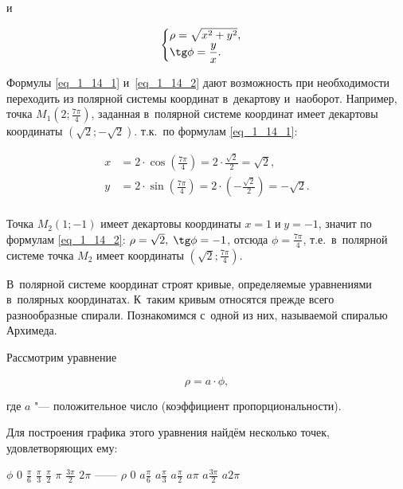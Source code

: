и

\begin{equation}\label{eq_1_14_2}
\begin{cases}
\rho = \sqrt{x^{2} + y^{2}}, \\
\displaystyle \tg \phi = \frac{y}{x}.
\end{cases}
\end{equation}

Формулы \eqref{eq_1_14_1} и~\eqref{eq_1_14_2} дают возможность при необходимости
переходить из полярной системы координат в~декартову и~наоборот.
Например, точка $\displaystyle M_{1} \left(2; \frac{7\pi}{4} \right)$,
заданная в~полярной системе координат имеет
декартовы координаты $(\sqrt{2}; -\sqrt{2})$.
т.к.\ по формулам \eqref{eq_1_14_1}:

\begin{align*}
\displaystyle x &= 2 \cdot \cos \left( \frac{7\pi}{4} \right) =
2 \cdot \frac{\sqrt{2}}{2} = \sqrt{2}, \\
\displaystyle y &= 2 \cdot \sin \left( \frac{7\pi}{4} \right) =
2 \cdot \left( -\frac{\sqrt{2}}{2} \right) = -\sqrt{2}. \\
\end{align*}

Точка $M_{2}(1; -1)$ имеет декартовы координаты
$x = 1 \; \text{и} \; y = -1$,
значит по формулам \eqref{eq_1_14_2}:
$\rho = \sqrt{2}, \; \tg \phi = -1$,
отсюда
$\displaystyle \phi = \frac{7\pi}{4}$,
т.е.\ в~полярной системе точка $M_{2}$ имеет координаты 
$\displaystyle \left( \sqrt{2}; \frac{7\pi}{4} \right)$.

В~полярной системе координат строят кривые, определяемые уравнениями в~полярных
координатах. К~таким кривым относятся прежде всего разнообразные спирали.
Познакомимся с~одной из них, называемой спиралью Архимеда.

Рассмотрим уравнение

\begin{equation*}\label{eq_1_14_3}
\rho = a \cdot \phi,
\end{equation*}

где $a$ "--- положительное число (коэффициент пропорциональности).

Для построения графика этого уравнения найдём несколько точек,
удовлетворяющих ему:

$\phi$
0
$\displaystyle \frac{\pi}{6}$
$\displaystyle \frac{\pi}{3}$
$\displaystyle \frac{\pi}{2}$
$\pi$
$\displaystyle \frac{3\pi}{2}$
$2\pi$
------
$\rho$
0
$\displaystyle a\frac{\pi}{6}$
$\displaystyle a\frac{\pi}{3}$
$\displaystyle a\frac{\pi}{2}$
$a\pi$
$\displaystyle a\frac{3\pi}{2}$
$a2\pi$


